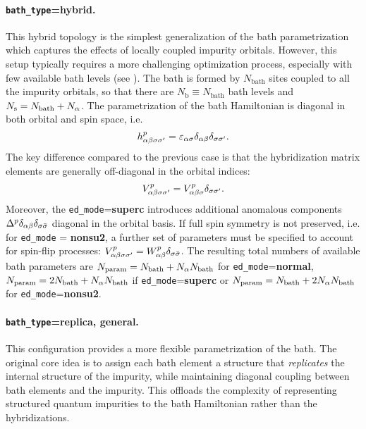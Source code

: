 \documentclass[edipack_sp.tex]{subfiles}
\begin{document}
\paragraph{{\tt bath\_type}={\bf hybrid}.}
This hybrid topology is the simplest generalization of the bath pa\-ra\-me\-tri\-za\-tion which captures the effects of locally
coupled impurity orbitals. However, this setup typically requires a more challenging optimization process, especially
with few available bath levels (see ). 
The bath is formed by $N_\mathrm{bath}$ sites coupled to all the
impurity orbitals, so that there are $N_\mathrm{b}\equiv  N_\mathrm{bath}$ bath levels and   $N_\mathrm{s}=N_\mathrm{bath}+N_\alpha$. 
The parametrization of the bath Hamiltonian is 
diagonal in both orbital and spin space, i.e.
$$
h^p_{\alpha\beta\sigma\sigma'}=\varepsilon_{\alpha\sigma}\delta_{\alpha\beta}\delta_{\sigma\sigma'}.
$$
%
The key difference compared to the previous case is that the hybridization matrix elements are generally off-diagonal in the orbital indices:
$$
V^p_{\alpha\beta\sigma\sigma'}=V^p_{\alpha\beta\sigma}\delta_{\sigma\sigma'}.
$$
Moreover, the {\tt ed\_mode}={\bf superc} introduces additional anomalous components 
$\Delta^p\delta_{\alpha\beta}\delta_{\sigma\bar{\sigma}}$ diagonal in the orbital basis.
%
If full spin symmetry is not preserved, i.e. for {\tt ed\_mode} = {\bf nonsu2}, a further 
set of parameters must be specified to account for spin-flip processes:
$V^p_{\alpha\beta\sigma\sigma'} = W^p_{\alpha\beta}\delta_{\sigma \bar{\sigma}}$. 
%
The resulting total numbers of available bath parameters are 
 $N_\mathrm{param}=N_\mathrm{bath}+ N_\alpha N_\mathrm{bath}$ for {\tt ed\_mode}={\bf normal},  
 $N_\mathrm{param}=2N_\mathrm{bath}+ N_\alpha N_\mathrm{bath}$ if  {\tt ed\_mode}={\bf superc} or 
$N_\mathrm{param}=N_\mathrm{bath}+ 2N_\alpha N_\mathrm{bath}$ for  {\tt ed\_mode}={\bf nonsu2}.



\paragraph{{\tt bath\_type}={\bf replica}, {\bf general}.}
This configuration provides a more flexible parametrization of the 
bath. The original core idea \cite{Capone2004PRB,Civelli2006,Koch2008PRB}
is to assign each bath element a structure 
that {\it replicates} the internal structure of the impurity, while 
maintaining diagonal coupling between bath elements and the impurity. 
This offloads the complexity of representing structured quantum 
impurities to the bath Hamiltonian rather than the hybridizations.
\end{document}
